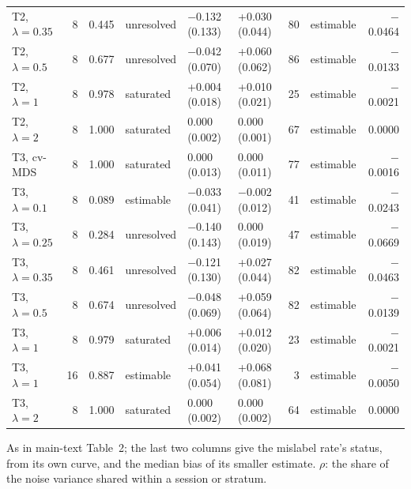 \documentclass[11pt]{article}
\newcommand{\tablenote}[1]{\par\smallskip\noindent
  \begin{minipage}{\linewidth}\footnotesize\setlength{\parindent}{0pt}#1\end{minipage}}
\begin{document}
\begin{table}[!htb]
\begin{tabular}{lrrlllrlr}
\quad T2, $\lambda=0.35$ & 8 & 0.445 & unresolved & $-$0.132 (0.133) & +0.030 (0.044) & 80 & estimable & $-$0.0464 \\
\quad T2, $\lambda=0.5$ & 8 & 0.677 & unresolved & $-$0.042 (0.070) & +0.060 (0.062) & 86 & estimable & $-$0.0133 \\
\quad T2, $\lambda=1$ & 8 & 0.978 & saturated & +0.004 (0.018) & +0.010 (0.021) & 25 & estimable & $-$0.0021 \\
\quad T2, $\lambda=2$ & 8 & 1.000 & saturated & 0.000 (0.002) & 0.000 (0.001) & 67 & estimable & 0.0000 \\
\quad T3, cv-MDS & 8 & 1.000 & saturated & 0.000 (0.013) & 0.000 (0.011) & 77 & estimable & $-$0.0016 \\
\quad T3, $\lambda=0.1$ & 8 & 0.089 & estimable & $-$0.033 (0.041) & $-$0.002 (0.012) & 41 & estimable & $-$0.0243 \\
\quad T3, $\lambda=0.25$ & 8 & 0.284 & unresolved & $-$0.140 (0.143) & 0.000 (0.019) & 47 & estimable & $-$0.0669 \\
\quad T3, $\lambda=0.35$ & 8 & 0.461 & unresolved & $-$0.121 (0.130) & +0.027 (0.044) & 82 & estimable & $-$0.0463 \\
\quad T3, $\lambda=0.5$ & 8 & 0.674 & unresolved & $-$0.048 (0.069) & +0.059 (0.064) & 82 & estimable & $-$0.0139 \\
\quad T3, $\lambda=1$ & 8 & 0.979 & saturated & +0.006 (0.014) & +0.012 (0.020) & 23 & estimable & $-$0.0021 \\
\quad T3, $\lambda=1$ & 16 & 0.887 & estimable & +0.041 (0.054) & +0.068 (0.081) & 3 & estimable & $-$0.0050 \\
\quad T3, $\lambda=2$ & 8 & 1.000 & saturated & 0.000 (0.002) & 0.000 (0.002) & 64 & estimable & 0.0000 \\
\bottomrule
\end{tabular}
\tablenote{As in main-text Table~2; the last two columns give the mislabel rate's status, from its own curve, and the median bias of its smaller estimate.
$\rho$: the share of the noise variance shared within a session or stratum.}
\end{table}
\end{document}
